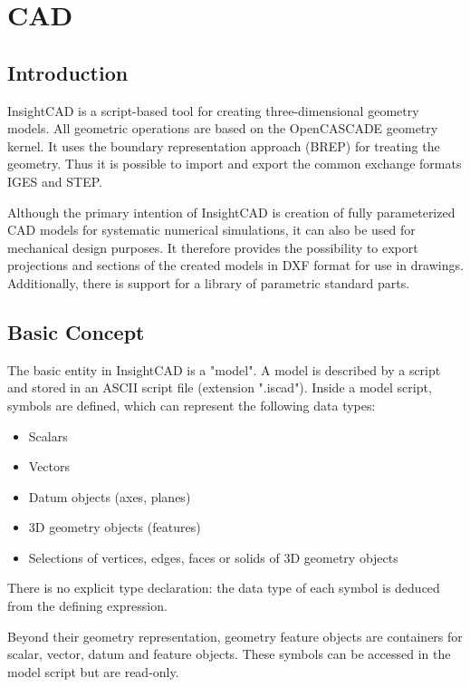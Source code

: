 \section{CAD}

\subsection{Introduction}

InsightCAD is a script-based tool for creating three-dimensional geometry models. 
All geometric operations are based on the OpenCASCADE geometry kernel. 
It uses the boundary representation approach (BREP) for treating the geometry. Thus it is possible to import and export the common exchange formats IGES and STEP.

Although the primary intention of InsightCAD is creation of
fully parameterized CAD models for systematic numerical simulations, it
can also be used for mechanical design purposes. 
It therefore provides the possibility to export projections and sections of the created models in DXF format for use in drawings. 
Additionally, there is support for a library of parametric standard parts.

\subsection{Basic Concept}

The basic entity in InsightCAD is a "model". A model is
described by a script and stored in an ASCII script file (extension
".iscad"). Inside a model script, symbols are defined, which can
represent the following data types:

\begin{itemize}
\item Scalars
\item Vectors
\item Datum objects (axes, planes)
\item 3D geometry objects (features)
\item Selections of vertices, edges, faces or solids of 3D geometry objects
\end{itemize}

There is no explicit type declaration: the data type of each symbol is
deduced from the defining expression.

Beyond their geometry representation, geometry feature objects are containers for scalar, vector, datum and feature objects. 
These symbols can be accessed in the model script but are read-only.

